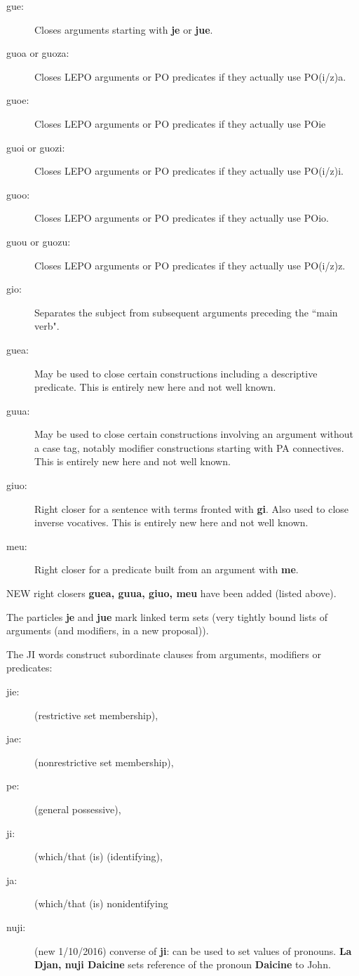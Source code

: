 \documentclass[12pt]{book}
\begin{document}
{\begin{description}
\item[gue:]   Closes arguments starting with {\bf je} or {\bf jue}.

\item[guoa or guoza:]  Closes LEPO arguments or PO predicates if they actually use PO(i/z)a.

\item[guoe:] Closes LEPO arguments or PO predicates if they actually use POie

\item[guoi or guozi:] Closes LEPO arguments or PO predicates if they actually use PO(i/z)i.

\item[guoo:] Closes LEPO arguments or PO predicates if they actually use POio.

\item[guou or guozu:] Closes LEPO arguments or PO predicates if they actually use PO(i/z)z.

\item[gio:]  Separates the subject from subsequent arguments preceding the ``main verb".

\item[guea:]  May be used to close certain constructions including a descriptive predicate.  This is entirely new here and not well known.

\item[guua:]  May be used to close certain constructions involving an argument without a case tag, notably modifier constructions starting with PA connectives.  This is entirely new here and not well known.

\item[giuo:]  Right closer for a sentence with terms fronted with {\bf gi}.  Also used to close inverse vocatives.  This is entirely new here and not well known.

\item[meu:]  Right closer for a predicate built from an argument with {\bf me}.

\end{description}

NEW right closers {\bf guea, guua, giuo, meu\/} have been added (listed above).

The particles {\bf je} and {\bf jue} mark linked term sets (very tightly bound lists of arguments (and modifiers, in a new proposal)).

The JI words  construct subordinate clauses from arguments,  modifiers or predicates:

\begin{description}
\item[jie:] (restrictive set membership), \item[jae:] (nonrestrictive set membership), \item[pe:] (general possessive), \item[ji:] (which/that (is) (identifying), \item[ja:] (which/that (is) nonidentifying\item[nuji:]  (new 1/10/2016)  converse of {\bf ji}:  can be used to set values of pronouns.  {\bf La Djan, nuji Daicine} sets reference of the pronoun {\bf Daicine} to
John.


\end{description}}
\end{document}
